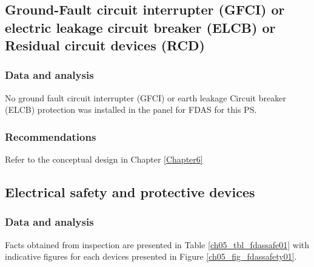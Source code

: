 \subsection{Ground-Fault circuit interrupter (GFCI) or electric leakage circuit breaker (ELCB) or Residual circuit devices (RCD)} \label{ch04fdas03}
\subsubsection{Data and analysis}
No ground fault circuit interrupter (GFCI) or earth leakage Circuit breaker (ELCB) protection was installed in the panel for FDAS for this PS.
\subsubsection{Recommendations}
Refer to the conceptual design in Chapter \ref{Chapter6}
\subsection{Electrical safety and protective devices} \label{ch04fdas04}
\subsubsection{Data and analysis}
Facts obtained from inspection are presented in Table \ref{ch05_tbl_fdassafe01} with indicative figures for each devices presented in Figure \ref{ch05_fig_fdassafety01}.

